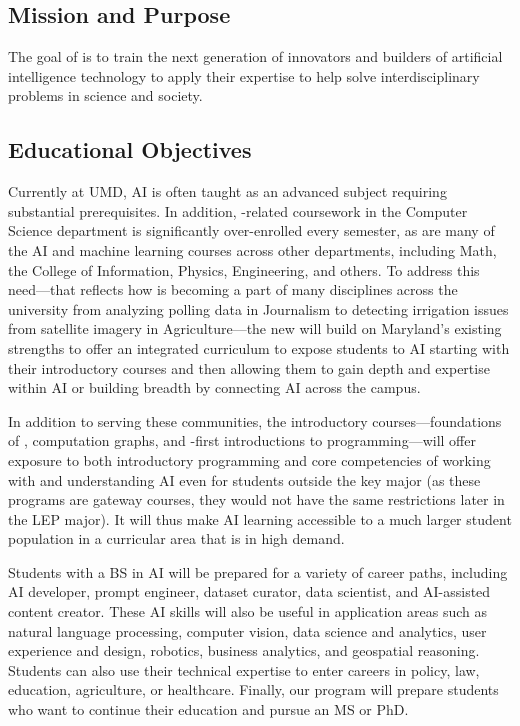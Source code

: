 
\subsection{Mission and Purpose}

The goal of \name{} is to train the next generation of innovators and builders of artificial intelligence technology to apply their expertise to help solve interdisciplinary problems in science and society.

\subsection{Educational Objectives}

Currently at UMD, AI is often taught as an advanced subject requiring substantial prerequisites. In addition, \ai{}-related coursework in the Computer Science department is significantly over-enrolled every semester, as are many of the AI and machine learning courses across other departments, including Math, the College of Information, Physics, Engineering, and others. 
%
To address this need---that reflects how \ai{} is becoming a part of many disciplines across the university from analyzing polling data in Journalism to detecting irrigation issues from satellite imagery in Agriculture---the new \short{} will build on Maryland's existing strengths to  offer an integrated curriculum to expose students to AI starting with their introductory courses and then allowing them to gain depth and expertise within AI or building breadth by connecting AI across the campus. 

In addition to serving these communities, the introductory courses---foundations of \ai{}, computation graphs, and \ai{}-first introductions to programming---will offer exposure to both introductory programming and core competencies of working with and understanding AI even for students outside the key major (as these programs are gateway courses, they would not have the same restrictions later in the LEP major).  It will thus make AI learning accessible to a much larger student population in a curricular area that is in high demand.

Students with a BS in AI will be prepared for a variety of career paths, including AI developer, prompt engineer, dataset curator, data scientist, and AI-assisted content creator.  These AI skills will also be useful in application areas such as natural language processing, computer vision, data science and analytics, user experience and design, robotics, business analytics, and geospatial reasoning. Students can also use their technical expertise to enter careers in policy, law, education, agriculture, or healthcare. Finally, our program will prepare students who want to continue their education and pursue an MS or PhD.


